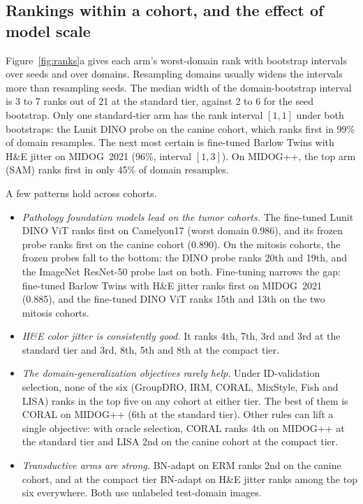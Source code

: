 \subsection{Rankings within a cohort, and the effect of model scale}
\label{sec:results-ranks}

Figure~\ref{fig:ranks}a gives each arm's worst-domain rank with bootstrap
intervals over seeds and over domains. Resampling domains usually widens the
intervals more than resampling seeds. The median width of the domain-bootstrap
interval is 3 to 7 ranks out of 21 at the standard tier, against 2 to 6 for
the seed bootstrap. Only one standard-tier arm has the rank interval $[1,1]$ under both
bootstraps: the Lunit DINO probe on the canine cohort, which ranks first in
99\% of domain resamples. The next most certain is fine-tuned Barlow Twins with
H\&E jitter on MIDOG~2021 (96\%, interval $[1,3]$). On MIDOG++, the top arm
(SAM) ranks first in only 45\% of domain resamples.

A few patterns hold across cohorts.
\begin{itemize}
  \item \emph{Pathology foundation models lead on the tumor cohorts.} The
    fine-tuned Lunit DINO ViT ranks first on Camelyon17 (worst domain 0.986),
    and its frozen probe ranks first on the canine cohort (0.890). On the
    mitosis cohorts, the frozen probes fall to the bottom: the DINO probe ranks
    20th and 19th, and the ImageNet ResNet-50 probe last on both. Fine-tuning
    narrows the gap: fine-tuned Barlow Twins with H\&E jitter ranks first on
    MIDOG~2021 (0.885), and the fine-tuned DINO ViT ranks 15th and 13th on the
    two mitosis cohorts.
  \item \emph{H\&E color jitter is consistently good.} It ranks 4th, 7th, 3rd
    and 3rd at the standard tier and 3rd, 8th, 5th and 8th at the compact
    tier.
  \item \emph{The domain-generalization objectives rarely help.} Under
    ID-validation selection, none of the six (GroupDRO, IRM, CORAL, MixStyle,
    Fish and LISA) ranks in the top five on any cohort at either tier. The
    best of them is CORAL on MIDOG++ (6th at the standard tier). Other rules
    can lift a single objective: with oracle selection, CORAL ranks 4th on
    MIDOG++ at the standard tier and LISA 2nd on the canine cohort at the
    compact tier.
  \item \emph{Transductive arms are strong.} BN-adapt on ERM ranks 2nd on the
    canine cohort, and at the compact tier BN-adapt on H\&E jitter ranks among
    the top six everywhere. Both use unlabeled test-domain images.
\end{itemize}

